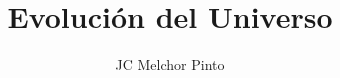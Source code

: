\documentclass[12pt,addpoints,answers]{guia}
\title{Evolución del Universo}
\author{JC Melchor Pinto}
\begin{document}
\INFO%
\begin{questions}
    \questionboxed[25]{}
    \questionboxed[25]{}
\end{questions}
\end{document}
